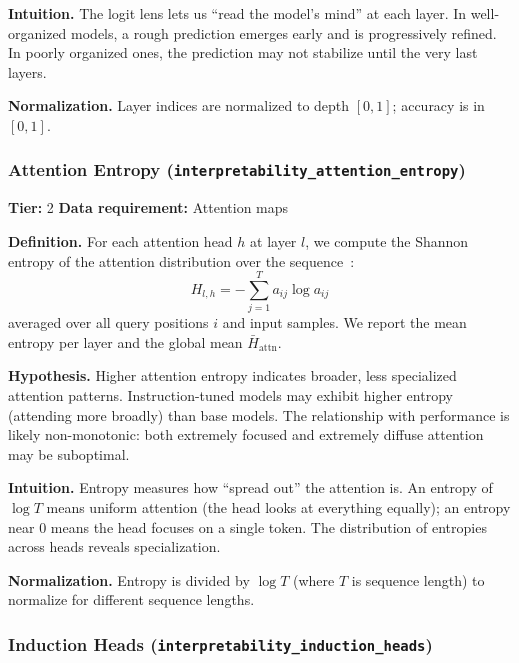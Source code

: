 \documentclass{article}
\begin{document}
\textbf{Intuition.}
The logit lens lets us ``read the model's mind'' at each layer. In well-organized models, a rough prediction emerges early and is progressively refined. In poorly organized ones, the prediction may not stabilize until the very last layers.

\textbf{Normalization.} Layer indices are normalized to depth $[0, 1]$; accuracy is in $[0, 1]$.

\subsubsection{Attention Entropy (\texttt{interpretability\_attention\_entropy})}
\label{app:attn-entropy}

\textbf{Tier:} 2 \quad \textbf{Data requirement:} Attention maps

\textbf{Definition.}
For each attention head $h$ at layer $l$, we compute the Shannon entropy of the attention distribution over the sequence~\citep{clark2019what}:
\begin{equation}
  H_{l,h} = -\sum_{j=1}^{T} a_{ij} \log a_{ij}
\end{equation}
averaged over all query positions $i$ and input samples. We report the mean entropy per layer and the global mean $\bar{H}_{\text{attn}}$.

\textbf{Hypothesis.}
Higher attention entropy indicates broader, less specialized attention patterns. Instruction-tuned models may exhibit higher entropy (attending more broadly) than base models. The relationship with performance is likely non-monotonic: both extremely focused and extremely diffuse attention may be suboptimal.

\textbf{Intuition.}
Entropy measures how ``spread out'' the attention is. An entropy of $\log T$ means uniform attention (the head looks at everything equally); an entropy near 0 means the head focuses on a single token. The distribution of entropies across heads reveals specialization.

\textbf{Normalization.} Entropy is divided by $\log T$ (where $T$ is sequence length) to normalize for different sequence lengths.

\subsubsection{Induction Heads (\texttt{interpretability\_induction\_heads})}
\label{app:induction}
\end{document}
